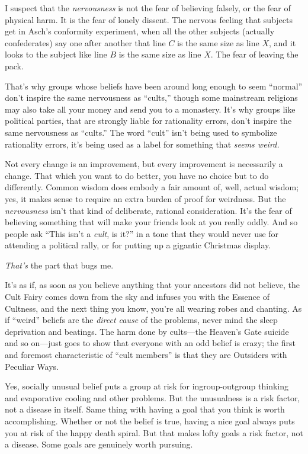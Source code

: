 {
 I suspect that the \textit{nervousness} is not the fear of
believing falsely, or the fear of physical harm. It is the fear of
lonely dissent. The nervous feeling that subjects get in
Asch's conformity experiment, when all the other
subjects (actually confederates) say one after another that line $C$ is
the same size as line $X$, and it looks to the subject like line $B$ is the
same size as line $X$. The fear of leaving the pack.}

{
 That's why groups whose beliefs have been around
long enough to seem ``normal''
don't inspire the same nervousness as
``cults,'' though some mainstream
religions may also take all your money and send you to a monastery.
It's why groups like political parties, that are
strongly liable for rationality errors, don't inspire
the same nervousness as ``cults.''
The word ``cult''
isn't being used to symbolize rationality errors,
it's being used as a label for something that
\textit{seems weird.}}

{
 Not every change is an improvement, but every improvement is
necessarily a change. That which you want to do better, you have no
choice but to do differently. Common wisdom does embody a fair amount
of, well, actual wisdom; yes, it makes sense to require an extra burden
of proof for weirdness. But the \textit{nervousness}
isn't that kind of deliberate, rational consideration.
It's the fear of believing something that will make
your friends look at you really oddly. And so people ask
``This isn't a \textit{cult}, is
it?'' in a tone that they would never use for
attending a political rally, or for putting up a gigantic Christmas
display.}

{
 \textit{That's} the part that bugs me.}

{
 It's as if, as soon as you believe anything that
your ancestors did not believe, the Cult Fairy comes down from the sky
and infuses you with the Essence of Cultness, and the next thing you
know, you're all wearing robes and chanting. As if
``weird'' beliefs are the
\textit{direct cause} of the problems, never mind the sleep deprivation
and beatings. The harm done by cults---the Heaven's
Gate suicide and so on---just goes to show that everyone with an odd
belief is crazy; the first and foremost characteristic of
``cult members'' is that they are
Outsiders with Peculiar Ways.}

{
 Yes, socially unusual belief puts a group at risk for
ingroup-outgroup thinking and evaporative cooling and other problems.
But the unusualness is a risk factor, not a disease in itself. Same
thing with having a goal that you think is worth accomplishing. Whether
or not the belief is true, having a nice goal always puts you at risk
of the happy death spiral. But that makes lofty goals a risk factor,
not a disease. Some goals are genuinely worth pursuing.}

